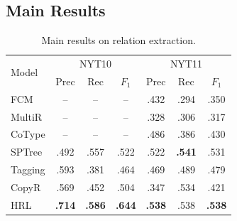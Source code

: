 \documentclass[letterpaper]{article} %
\theoremstyle{definition}
\begin{document}
\subsection{Main Results}

\begin{table}[!htb]
    \centering
    \begin{tabular}{lcccccc}%
    \toprule
        \multirow{2}{*}{Model} & \multicolumn{3}{c}{NYT10
        } & \multicolumn{3}{c}{NYT11}\\ %
         & Prec & Rec & $F_1$ & Prec & Rec & $F_1$\\ %
    \midrule
        FCM & -- & -- & -- & .432 & .294 & .350 \\%
        MultiR & -- & -- & -- & .328 & .306 & .317 \\%
        CoType & -- & -- & -- & .486 & .386 & .430 \\%
        SPTree & .492 & .557 & .522 & .522 & \textbf{.541} & .531 \\%
        Tagging & .593 & .381 & .464 & .469 & .489 & .479 \\%
        CopyR & .569 & .452 & .504 & .347 & .534 & .421 \\
    \midrule
        HRL & \textbf{.714} & \textbf{.586} & \textbf{.644} & \textbf{.538} & .538 & \textbf{.538} \\%
    \bottomrule
    \end{tabular}
    \caption{Main results on relation extraction.}
    \label{main}
\end{table}
\end{document}
